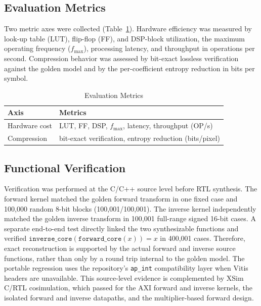 \documentclass[conference]{IEEEtran}
\begin{document}
\subsection{Evaluation Metrics}
Two metric axes were collected (Table~\ref{tab:expplan}). Hardware efficiency was 
measured by look-up table (LUT), flip-flop (FF), and DSP-block utilization, the 
maximum operating frequency ($f_{\max}$), processing latency, and throughput in 
operations per second. 
Compression behavior was assessed by bit-exact lossless verification against the 
golden model and by the per-coefficient entropy reduction in bits per symbol.

\begin{table}[htbp]
\caption{Evaluation Metrics}
\label{tab:expplan}
\centering
\begin{tabular}{@{}ll@{}}
\hline
\textbf{Axis} & \textbf{Metrics} \\
\hline
Hardware cost & LUT, FF, DSP, $f_{\max}$, latency, throughput (OP/s) \\
Compression   & bit-exact verification, entropy reduction (bits/pixel) \\
\hline
\end{tabular}
\end{table}

\subsection{Functional Verification}
Verification was performed at the C/C++ source level before RTL synthesis. The
forward kernel matched the golden forward transform in one fixed case and
100,000 random 8-bit blocks (100,001/100,001). The inverse kernel independently
matched the golden inverse transform in 100,001 full-range signed 16-bit cases.
A separate end-to-end test directly linked the two synthesizable functions and
verified
\(\texttt{inverse\_core}(\texttt{forward\_core}(x))=x\) in 400,001 cases.
Therefore, exact reconstruction is supported by the actual forward and inverse
source functions, rather than only by a round trip internal to the golden model.
The portable regression uses the repository's \texttt{ap\_int} compatibility
layer when Vitis headers are unavailable. This source-level evidence is
complemented by XSim C/RTL cosimulation, which passed for the AXI forward and
inverse kernels, the isolated forward and inverse datapaths, and the
multiplier-based forward design.
\end{document}
